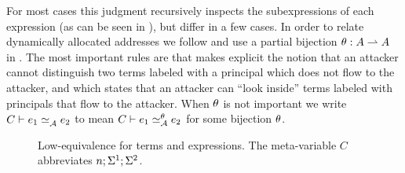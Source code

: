 For most cases this judgment recursively inspects the subexpressions of each expression (as can be seen in ), but differ in a few cases. In order to relate dynamically allocated addresses we follow \cite{Banerjee:2002:SIF:794201.795164} and use a partial bijection $\theta: A \rightharpoonup A$ in . The most important rules are  that makes explicit the notion that an attacker cannot distinguish two terms labeled with a principal which does not flow to the attacker, and  which states that an attacker can ``look inside'' terms labeled with principals that flow to the attacker. When $\theta$ is not important we write $\loweq{C}{\Attacker}{\expr_1}{\expr_2}$ to mean $\loweq{C}{\Attacker}[\bijection]{\expr_1}{\expr_2}$ for some bijection $\theta$.

\begin{figure}
    \centering
    \caption{Low-equivalence for terms and expressions. The meta-variable $C$ abbreviates $n; \Sigma^1; \Sigma^2$.}
    \label{fig:low-eq-expr}
\end{figure}

